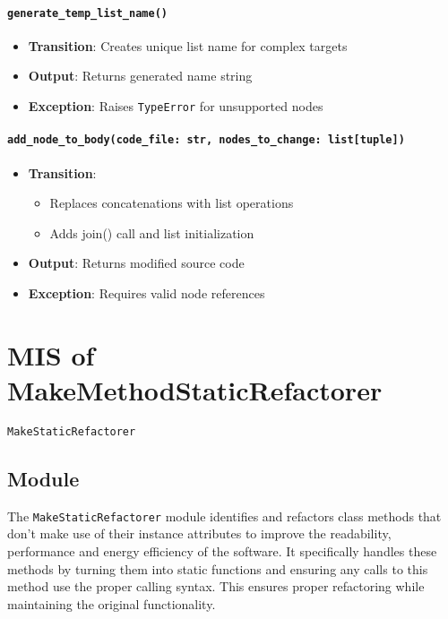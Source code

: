 \documentclass[12pt, titlepage]{article}
\begin{document}
  \paragraph{\texttt{generate\_temp\_list\_name()}}
  \begin{itemize}
  \item \textbf{Transition}: Creates unique list name for complex targets
  \item \textbf{Output}: Returns generated name string
  \item \textbf{Exception}: Raises \texttt{TypeError} for unsupported nodes
  \end{itemize}
  
  \paragraph{\texttt{add\_node\_to\_body(code\_file: str, nodes\_to\_change: list[tuple])}}
  \begin{itemize}
  \item \textbf{Transition}:
  \begin{itemize}
  \item Replaces concatenations with list operations
  \item Adds join() call and list initialization
  \end{itemize}
  \item \textbf{Output}: Returns modified source code
  \item \textbf{Exception}: Requires valid node references
  \end{itemize}

  
\newpage

\section{MIS of MakeMethodStaticRefactorer} \label{mis:MakeStatic}

\texttt{MakeStaticRefactorer}

\subsection{Module}

The \texttt{MakeStaticRefactorer} module identifies and refactors 
class methods that don't make use of their instance attributes to improve the readability, performance and energy efficiency of the software. It specifically handles these methods by turning them into static functions and ensuring any calls to this method use the proper calling syntax. This ensures proper refactoring while maintaining the original functionality.
\end{document}
